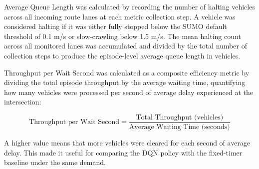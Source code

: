 Average Queue Length was calculated by recording the number of halting vehicles across all incoming route lanes at each metric collection step. A vehicle was considered halting if it was either fully stopped below the SUMO default threshold of 0.1 m/s or slow-crawling below 1.5 m/s. The mean halting count across all monitored lanes was accumulated and divided by the total number of collection steps to produce the episode-level average queue length in vehicles.

Throughput per Wait Second was calculated as a composite efficiency metric by dividing the total episode throughput by the average waiting time, quantifying how many vehicles were processed per second of average delay experienced at the intersection:

$$\text{Throughput per Wait Second} = \frac{\text{Total Throughput (vehicles)}}{\text{Average Waiting Time (seconds)}}$$

A higher value means that more vehicles were cleared for each second of
average delay. This made it useful for comparing the DQN policy with the
fixed-timer baseline under the same demand.

